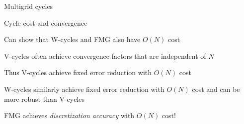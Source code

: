 \documentclass[18pt,xcolor=table]{beamer}
\begin{document}
\begin{frame}{Multigrid cycles}
\begin{block}{Cycle cost and convergence}
\bit
\item Can show that W-cycles and FMG also have $O(N)$ cost
\item V-cycles often achieve convergence factors that are independent of $N$
\item Thus V-cycles achieve fixed error reduction with $O(N)$ cost
\item W-cycles similarly achieve fixed error reduction with $O(N)$ cost and can be more robust than V-cycles
\item FMG achieves \emph{discretization accuracy} with $O(N)$ cost!
\eit
\end{block}
\end{frame}


\end{document}
